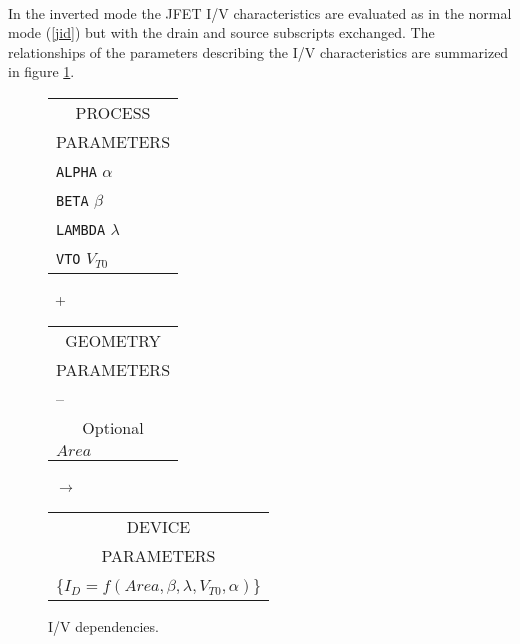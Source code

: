 \\[0.2in]
In the inverted mode the JFET I/V characteristics are evaluated as in the
normal mode (\ref{jid}) but with the drain and source subscripts
exchanged.
The relationships of the parameters describing the I/V
characteristics are summarized in figure
\ref{ji/v}.\\[0.1in]
\begin{figure}[hbp]
\begin{tabular}[t]{|p{1in}|}
\hline
\multicolumn{1}{|c|}{PROCESS} \\
\multicolumn{1}{|c|}{PARAMETERS} \\
\hline
{\tt ALPHA} \hfill $\alpha$\\
{\tt BETA} \hfill $\beta$\\
{\tt LAMBDA} \hfill $\lambda$\\
{\tt VTO} \hfill $V_{T0}$\\
\hline
\end{tabular}
\hfill
\parbox{0.1in}{\ \vspace*{0.2in}\newline +}
\hfill
\begin{tabular}[t]{|p{1in}|}
\hline
\multicolumn{1}{|c|}{GEOMETRY} \\
\multicolumn{1}{|c|}{PARAMETERS} \\
\hline
\hspace*{\fill} -- \hspace*{\fill} \\
\hline
\hline
\multicolumn{1}{|c|}{Optional} \\
\hline
\hspace*{\fill}$Area$\\
\hline
\end{tabular}
\hfill
\parbox{0.1in}{\ \vspace*{0.2in}\newline $\rightarrow$}
\hfill
\begin{tabular}[t]{|p{1.8in}|}
\hline
\multicolumn{1}{|c|}{DEVICE} \\
\multicolumn{1}{|c|}{PARAMETERS} \\
\hline
\{$I_{D} = f(Area, \beta, \lambda, V_{T0}, \alpha)$\}\\
\hline
\end{tabular}
\caption{I/V dependencies. \label{ji/v}}
\end{figure}

